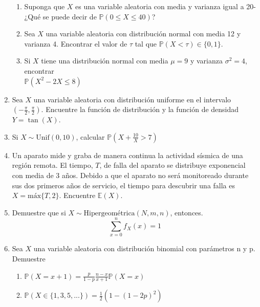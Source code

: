 \documentclass[11pt,a4paper]{report}
\begin{document}
\begin{enumerate}
{\begin{enumerate}
				\item {
					Suponga que $X$ es una variable aleatoria con media y
					varianza igual a 20- ¿Qué se puede decir de
					$\mathbb{P}(0 \leq X \leq 40)$?
				}

				\item {
					Sea $X$ una variable aleatoria con distribución normal con
					media 12 y varianza 4. Encontrar el valor de $\tau$ tal que
					$\mathbb{P}(X < \tau) \in \{0,1\}$.
				}

				\item {
					Si $X$ tiene una distribución normal con media $\mu = 9$ y
					varianza $\sigma^2 = 4$, encontrar \\
					$\mathbb{P}(X^2 - 2X \leq 8)$
				}
			\end{enumerate}
		}

		\item{
			Sea $X$ una variable aleatoria con distribución uniforme en el
			intervalo $(-\frac{\pi}{2}, \frac{\pi}{2})$. Encuentre la función de
			distribución y la función de densidad $Y = \tan(X)$.
		}

		\item{
			Si $X \sim \text{Unif}(0, 10)$, calcular
			$\mathbb{P}(X + \frac{10}{X} > 7)$
		}

		\item{
			Un aparato mide y graba de manera continua la actividad sísmica de
			una región remota. El tiempo, $T$, de falla del aparato se
			distribuye exponencial con media de 3 años. Debido a que el aparato
			no será monitoreado durante sus dos primeros años de servicio, el
			tiempo para descubrir una falla es $X = \text{máx}\{T,2\}$.
			Encuentre $\mathbb{E}(X)$.
		}

		\item{
			Demuestre que si $X \sim \text{Hipergeométrica}(N,m,n)$, entonces.
				$$ \sum_{x = 0}^{n}f_X(x) = 1$$
		}

		\item{
			Sea $X$ una variable aleatoria con distribución binomial con
			parámetros n y p. Demuestre
			\begin{enumerate}
				\item {
					$\mathbb{P}(X = x + 1) = \frac{p}{1 - p} \frac{n - x}{x + 1}
					 \mathbb{P}(X = x)$
				}

				\item {
					$\mathbb{P}(X \in \{ 1,3,5,...\}) = \frac{1}{2}
					 (1 - (1 - 2p)^2)$
				}


\end{enumerate}}
\end{enumerate}
\end{document}
